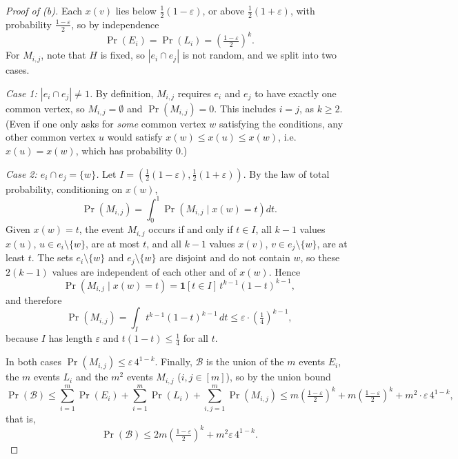 \documentclass[a4paper,12pt]{article}
\newcommand{\eps}{\varepsilon}
\begin{document}
\begin{proof}[Proof of (b)]
	Each $x(v)$ lies below $\frac12(1-\eps)$, or above $\frac12(1+\eps)$, with probability $\frac{1-\eps}{2}$, so by independence
	\[
		\Pr(E_i) = \Pr(L_i) = \left( \tfrac{1-\eps}{2} \right)^k.
	\]
	For $M_{i,j}$, note that $H$ is fixed, so $|e_i \cap e_j|$ is not random, and we split into two cases.

	\emph{Case 1: $|e_i \cap e_j| \ne 1$.} By definition, $M_{i,j}$ requires $e_i$ and $e_j$ to have exactly one common vertex, so $M_{i,j} = \emptyset$ and $\Pr(M_{i,j}) = 0$. This includes $i = j$, as $k \ge 2$. (Even if one only asks for \emph{some} common vertex $w$ satisfying the conditions, any other common vertex $u$ would satisfy $x(w) \le x(u) \le x(w)$, i.e.\ $x(u) = x(w)$, which has probability $0$.)

	\emph{Case 2: $e_i \cap e_j = \{w\}$.} Let $I = \left( \frac12(1-\eps), \frac12(1+\eps) \right)$. By the law of total probability, conditioning on $x(w)$,
	\[
		\Pr(M_{i,j}) = \int_0^1 \Pr\left( M_{i,j} \mid x(w) = t \right) dt.
	\]
	Given $x(w) = t$, the event $M_{i,j}$ occurs if and only if $t \in I$, all $k-1$ values $x(u)$, $u \in e_i \setminus \{w\}$, are at most $t$, and all $k-1$ values $x(v)$, $v \in e_j \setminus \{w\}$, are at least $t$. The sets $e_i \setminus \{w\}$ and $e_j \setminus \{w\}$ are disjoint and do not contain $w$, so these $2(k-1)$ values are independent of each other and of $x(w)$. Hence
	\[
		\Pr\left( M_{i,j} \mid x(w) = t \right) = \mathbf{1}[t \in I] \, t^{k-1} (1-t)^{k-1},
	\]
	and therefore
	\[
		\Pr(M_{i,j}) = \int_I t^{k-1} (1-t)^{k-1} \, dt \le \eps \cdot \left( \tfrac14 \right)^{k-1},
	\]
	because $I$ has length $\eps$ and $t(1-t) \le \frac14$ for all $t$.

	In both cases $\Pr(M_{i,j}) \le \eps \, 4^{1-k}$. Finally, $\mathcal{B}$ is the union of the $m$ events $E_i$, the $m$ events $L_i$ and the $m^2$ events $M_{i,j}$ ($i, j \in [m]$), so by the union bound
	\[
		\Pr(\mathcal{B}) \le \sum_{i=1}^m \Pr(E_i) + \sum_{i=1}^m \Pr(L_i) + \sum_{i,j=1}^m \Pr(M_{i,j}) \le m \left( \tfrac{1-\eps}{2} \right)^k + m \left( \tfrac{1-\eps}{2} \right)^k + m^2 \cdot \eps \, 4^{1-k},
	\]
	that is,
	\[
		\Pr(\mathcal{B}) \le 2m \left( \tfrac{1-\eps}{2} \right)^k + m^2 \eps \, 4^{1-k}.
	\]
\end{proof}
\end{document}
